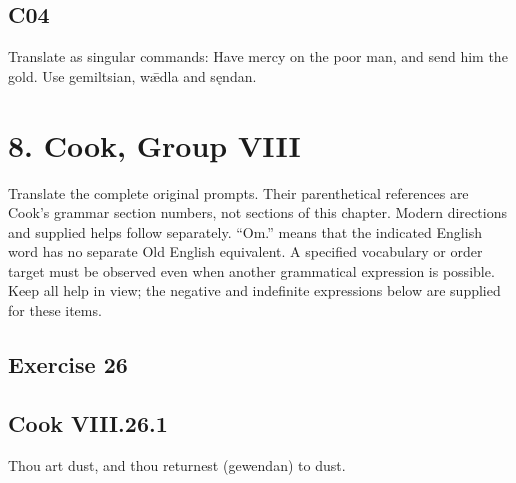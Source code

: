 \par\begin{minipage}{\linewidth}\raggedright
\subsection*{C04}

Translate as singular commands: Have mercy on the poor man, and send him the gold. Use gemiltsian, wǣdla and sęndan.

\end{minipage}\par\addvspace{4pt}

\section*{8. Cook, Group VIII}

Translate the complete original prompts. Their parenthetical references are Cook’s grammar section numbers, not sections of this chapter. Modern directions and supplied helps follow separately. “Om.” means that the indicated English word has no separate Old English equivalent. A specified vocabulary or order target must be observed even when another grammatical expression is possible. Keep all help in view; the negative and indefinite expressions below are supplied for these items.

\subsection*{Exercise 26}

\par\begin{minipage}{\linewidth}\raggedright
\subsection*{Cook VIII.26.1}

Thou art dust, and thou returnest (gewendan) to dust.

\end{minipage}\par\addvspace{4pt}


